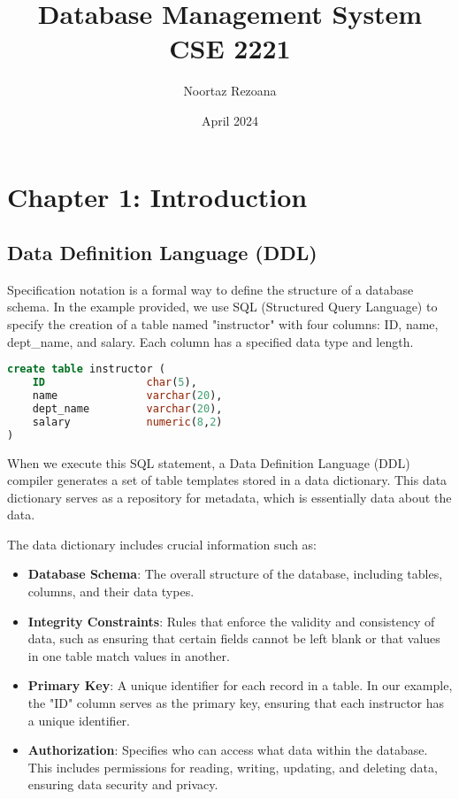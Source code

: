 \documentclass{article}
\title{Database Management System \\ CSE 2221}
\author{Noortaz Rezoana}
\date{April 2024}
\begin{document}
\maketitle

\newpage
\section*{Chapter 1: Introduction}

\subsection*{Data Definition Language (DDL)}

Specification notation is a formal way to define the structure of a database schema. In the example provided, we use SQL (Structured Query Language) to specify the creation of a table named "instructor" with four columns: ID, name, dept\_name, and salary. Each column has a specified data type and length.

\begin{lstlisting}[language=SQL]
create table instructor (
    ID                char(5),
    name              varchar(20),
    dept_name         varchar(20),
    salary            numeric(8,2)
)
\end{lstlisting}

When we execute this SQL statement, a Data Definition Language (DDL) compiler generates a set of table templates stored in a data dictionary. This data dictionary serves as a repository for metadata, which is essentially data about the data. 

The data dictionary includes crucial information such as:

\begin{itemize}
    \item \textbf{Database Schema}: The overall structure of the database, including tables, columns, and their data types.
    \item \textbf{Integrity Constraints}: Rules that enforce the validity and consistency of data, such as ensuring that certain fields cannot be left blank or that values in one table match values in another.
    \item \textbf{Primary Key}: A unique identifier for each record in a table. In our example, the "ID" column serves as the primary key, ensuring that each instructor has a unique identifier.
    \item \textbf{Authorization}: Specifies who can access what data within the database. This includes permissions for reading, writing, updating, and deleting data, ensuring data security and privacy.
\end{itemize}
\end{document}
